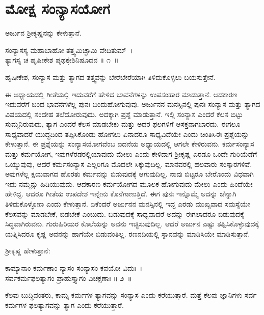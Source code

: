 
\chapter{ಮೋಕ್ಷ ಸಂನ್ಯಾಸಯೋಗ}

ಅರ್ಜುನ ಶ‍್ರೀಕೃಷ್ಣನನ್ನು ಕೇಳುತ್ತಾನೆ.

\begin{shloka}
ಸಂನ್ಯಾಸಸ್ಯ ಮಹಾಬಾಹೋ ತತ್ತ್ವಮಿಚ್ಛಾಮಿ ವೇದಿತುಮ್~।\\ತ್ಯಾಗಸ್ಯ ಚ ಹೃಷೀಕೇಶ ಪೃಥಕ್ಕೇಶಿನಿಷೂದನ \hfill॥ ೧~॥
\end{shloka}

\begin{artha}
ಹೃಷೀಕೇಶ, ಸಂನ್ಯಾಸ ಮತ್ತು ತ್ಯಾಗದ ತತ್ತ್ವವನ್ನು ಬೇರೆಬೇರೆಯಾಗಿ ತಿಳಿದುಕೊಳ್ಳಲು ಬಯಸುತ್ತೇನೆ.
\end{artha}

ಈ ಅಧ್ಯಾಯದಲ್ಲಿ ಗೀತೆಯಲ್ಲಿ ಇದುವರೆಗೆ ಹೇಳಿದ ಭಾವನೆಗಳನ್ನು ಉಪಸಂಹಾರ ಮಾಡುತ್ತಾನೆ. ಆದಕಾರಣ ಇದುವರೆಗೆ ಬಂದ ಭಾವನೆಗಳೆಲ್ಲ ಪುನಃ ಬಂದುಹೋಗುವುವು. ಅರ್ಜುನನ ಮನಸ್ಸಿನಲ್ಲಿ ಪುನಃ ಸಂನ್ಯಾಸ ಮತ್ತು ತ್ಯಾಗದ ವಿಷಯದಲ್ಲಿ ಸಂದೇಹ ತಲೆದೋರುವುದು. ಅದಕ್ಕಾಗಿ ಪ್ರಶ್ನೆ ಮಾಡುತ್ತಾನೆ. ಇಲ್ಲಿ ಸಂನ್ಯಾಸ ಎಂದರೆ ಕೆಲಸ ಬಿಟ್ಟು ಸುಮ್ಮನಿರುವುದು, ತ್ಯಾಗ ಎಂದರೆ ಕೆಲಸ ಮಾಡಬೇಕು ಮತ್ತು ಅದರ ಫಲಗಳಿಗೆ ಆಸಕ್ತನಾಗಬಾರದು. ಈಗಲೂ ಸಾಧ್ಯವಾದರೆ ಯುದ್ಧದಿಂದ ತಪ್ಪಿಸಿಕೊಂಡು ಹೋಗಲು ಏನಾದರೂ ಸಾಧ್ಯವಿದೆಯೇ ಎಂದು ಚಿಂತಿಸಿ\break ಈ ಪ್ರಶ್ನೆಯನ್ನು ಕೇಳುತ್ತಾನೆ. ಈ ಪ್ರಶ್ನೆಯನ್ನು ಸಂನ್ಯಾಸಯೋಗವೆಂಬ ಐದನೆಯ ಅಧ್ಯಾಯದಲ್ಲಿ ಆಗಲೇ ಕೇಳಿರುವನು. ಕರ್ಮಸಂನ್ಯಾಸ ಮತ್ತು ಕರ್ಮಯೋಗ, ಇವುಗಳೆರಡರಲ್ಲಿ\break ಯಾವುದು ಮೇಲು ಎಂದು ಕೇಳಿದಾಗ ಶ‍್ರೀಕೃಷ್ಣ ಎರಡೂ ಒಂದೇ ಗುರಿಯೆಡೆಗೆ ಒಯ್ಯುವುವು, ಆದರೆ ಕರ್ಮಸಂನ್ಯಾಸ ಎಲ್ಲರಿಗೂ ಮೊದಲೇ ಸಿಕ್ಕುವುದಿಲ್ಲ. ಮಾನವರಲ್ಲಿ ಹಲವಾರು ಸಂಸ್ಕಾರಗಳಿವೆ. ಅವುಗಳೆಲ್ಲ ಕ್ಷಯವಾಗದ ಹೊರತು ಕರ್ಮವನ್ನು ಬಿಡುವುದಕ್ಕೆ ಆಗುವುದಿಲ್ಲ. ನಾವು ಬಿಟ್ಟರೂ ಬೇರೊಂದು ವಿಧವಾಗಿ ಇದು ನಮ್ಮನ್ನು ಹಿಡಿಯುವುದು. ಆದಕಾರಣ ಕರ್ಮಯೋಗದ ಮೂಲಕ ಹೋಗುವುದು ಮೇಲು ಎಂದು ಹಿಂದೆಯೇ ಹೇಳಿದ್ದ. ಆದರೂ ಗೀತೆಯ ಉಪದೇಶ ಇನ್ನೇನು ಕೊನೆಗಾಣುತ್ತಿದೆ. ಈಗ ಪುನಃ ಇನ್ನೊಮ್ಮೆ ಅದನ್ನು ಚೆನ್ನಾಗಿ ತಿಳಿದುಕೊಳ್ಳೋಣ ಎಂದು ಕೇಳುತ್ತಾನೆ. ಏಕೆಂದರೆ ಅರ್ಜುನನ ಮನಸ್ಸಿನಲ್ಲಿ ಇದ್ದ ಎರಡು ಮುಖ್ಯವಾದ ಸಮಸ್ಯೆಯೇ ಕೆಲಸವನ್ನು ಮಾಡಬೇಕೆ, ಬಿಡಬೇಕೆ ಎಂಬುದು. ಬಿಡುವುದಕ್ಕೆ ಸಾಧ್ಯವಾದರೆ ಅದನ್ನು ಈಗಲಾದರೂ ಬಿಡುವುದಕ್ಕೆ ಸಿದ್ಧವಾಗಿರುವನು. ಗುರುಹಿರಿಯರ ಕೊಲೆಯನ್ನು ಅವನು ಇಚ್ಛಿಸುವುದಿಲ್ಲ. ಆದರೆ ಅರ್ಜುನ ಎಷ್ಟು ತಪ್ಪಿಸಿಕೊಳ್ಳುವುದಕ್ಕೆ ಯತ್ನಿಸಿದರೂ ಕೃಷ್ಣ ಅವನನ್ನು ಹಾಗೆಯೇ ಬಿಡುವಂತಿಲ್ಲ. ರಣನದಿಯಲ್ಲಿ ಸ್ನಾನವನ್ನು ಮಾಡಿಸಿಯೇ ಮಾಡಿಸುತ್ತಾನೆ.

\newpage

ಶ‍್ರೀಕೃಷ್ಣ ಹೇಳುತ್ತಾನೆ:

\begin{shloka}
ಕಾಮ್ಯಾನಾಂ ಕರ್ಮಣಾಂ ನ್ಯಾಸಂ ಸಂನ್ಯಾಸಂ ಕವಯೋ ವಿದುಃ~।\\ಸರ್ವಕರ್ಮಫಲತ್ಯಾಗಂ ಪ್ರಾಹುಸ್ತ್ಯಾಗಂ ವಿಚಕ್ಷಣಾಃ \hfill॥ ೨~॥
\end{shloka}

\begin{artha}
ಕೆಲವು ಬುದ್ಧಿವಂತರು, ಕಾಮ್ಯ ಕರ್ಮಗಳ ತ್ಯಾಗವನ್ನು ಸಂನ್ಯಾಸ ಎಂದು ಕರೆಯುತ್ತಾರೆ. ಮತ್ತೆ ಕೆಲವು ಜ್ಞಾನಿಗಳು ಸರ್ವ ಕರ್ಮಗಳ ಫಲತ್ಯಾಗವನ್ನು ತ್ಯಾಗ ಎಂದು ಕರೆಯುತ್ತಾರೆ.
\end{artha}

